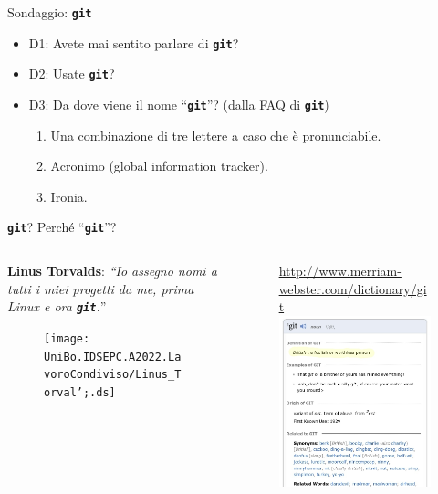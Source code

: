 \documentclass{beamer}
\newcommand{\git}{\texttt{\textbf{git}}\xspace}
\begin{document}
\begin{frame}{\centerline{Sondaggio: \git}}
  \begin{itemize}\setlength{\itemsep}{+3mm}
  \item D1: Avete mai sentito parlare di \git?
  \item D2: Usate \git?
  \item D3: Da dove viene il nome ``\git''? (dalla FAQ di \git)
    \begin{enumerate}\setlength{\itemsep}{+2mm}
    \item Una combinazione di tre lettere a caso che \`{e} pronunciabile.
    \item Acronimo (global information tracker).
    \item Ironia.
    \end{enumerate}
  \end{itemize}
\end{frame}

\begin{frame}{\centerline{\git? Perch\'{e} ``\git''?}}
  \begin{columns}
    \begin{column}{5cm}
      \textbf{Linus Torvalds}: 
        \emph{``Io assegno nomi a tutti i miei progetti da me, prima Linux e ora
        \git.}''
      \begin{figure}
        \centering
        \texttt{[image: UniBo.IDSEPC.A2022.LavoroCondiviso/Linus\_Torval';.ds]}
      \end{figure}
    \end{column}
    \begin{column}{7cm}
      \begin{figure}
        \url{http://www.merriam-webster.com/dictionary/git}
        \centering
        \includegraphics[width=5cm]{UniBo.IDSEPC.A2022.LavoroCondiviso/git-merriam}
      \end{figure}
    \end{column}
    \end{columns}
\end{frame}
\end{document}
